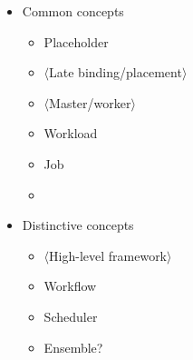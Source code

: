 \documentclass{sig-alternate}
\begin{document}
\begin{itemize}
    \item Common concepts
        \begin{itemize}
             \item Placeholder
             \item $\langle$Late binding/placement$\rangle$
             \item $\langle$Master/worker$\rangle$
             \item Workload
             \item Job
             \item \computeunit
        \end{itemize}
    \item Distinctive concepts
        \begin{itemize}
             \item $\langle$High-level framework$\rangle$
             \item Workflow
             \item Scheduler
             \item Ensemble?
        \end{itemize}
\end{itemize}


%
\end{document}
